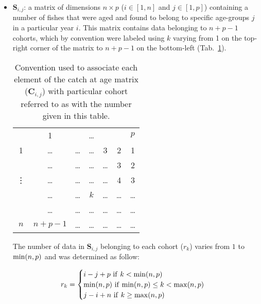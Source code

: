 \documentclass[12pt]{article}
\begin{document}
\begin{itemize}

\item $\bm{S}_{i,j}$: a matrix of dimensions $n \times p$ ($i \in [1, n]$ and $j \in [1, p]$) containing a number of fishes that were aged and found to belong to specific age-groups $j$ in a particular year $i$. This matrix contains data belonging to $n+p-1$ cohorts, which by convention were labeled using $k$ varying from 1 on the top-right corner of the matrix to $n+p-1$ on the bottom-left (Tab.~\ref{Tab:Cohorts}). 

%

\begin{table}[ht]
\begin{center}

\begin{tabular}{c|cccccc}
 \multicolumn{1}{c}{} & 1 & & \dots & & & $p$ \\
\cmidrule(r){2-7}
 1      & \dots   & \dots & \dots & 3     & 2       & 1      \\
        & \dots   & \dots & \dots & \dots & 3       & 2      \\
\vdots  & \dots   & \dots & \dots & \dots & 4       & 3      \\
        & \dots   & \dots & $k$   & \dots & \dots   & \dots  \\
        & \dots   & \dots & \dots & \dots & \dots   & \dots  \\
$n$     & $n+p-1$ & \dots & \dots & \dots & \dots   & \dots  \\
\end{tabular}

\caption{Convention used to associate each element of the catch at age matrix ($\bm{C}_{i,j}$) with particular cohort referred to as with the number given in this table.}
\label{Tab:Cohorts}


\end{center}
\end{table}

The number of data in $\bm{S}_{i,j}$ belonging to each cohort ($r_{k}$) varies from $1$ to ${\rm min}(n,p)$ and was determined as follow:

\begin{equation}
r_{k} = 
\begin{cases}
i - j + p \ {\rm if} \ k < {\rm min}(n,p)  \\ 
{\rm min}(n,p) \ {\rm if} \ {\rm min}(n,p) \leq k < {\rm max}(n,p) \\
j - i + n \ {\rm if} \ k \geq {\rm max}(n,p) \\
\end{cases}
\end{equation}



\end{itemize}
\end{document}
